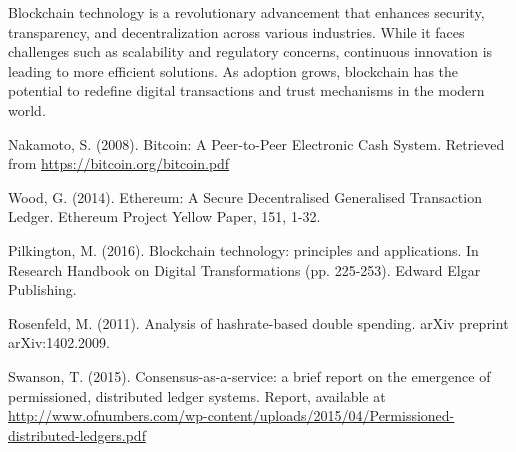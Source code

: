 \documentclass[11pt]{article}
\begin{document}
Blockchain technology is a revolutionary advancement that enhances security, transparency, and decentralization across various industries. While it faces challenges such as scalability and regulatory concerns, continuous innovation is leading to more efficient solutions. As adoption grows, blockchain has the potential to redefine digital transactions and trust mechanisms in the modern world.



\clearpage
\begin{thebibliography}{99}

Nakamoto, S. (2008). Bitcoin: A Peer-to-Peer Electronic Cash System. Retrieved from \url{https://bitcoin.org/bitcoin.pdf}

Wood, G. (2014). Ethereum: A Secure Decentralised Generalised Transaction Ledger. Ethereum Project Yellow Paper, 151, 1-32.

Pilkington, M. (2016). Blockchain technology: principles and applications. In Research Handbook on Digital Transformations (pp. 225-253). Edward Elgar Publishing.

Rosenfeld, M. (2011). Analysis of hashrate-based double spending. arXiv preprint arXiv:1402.2009.

Swanson, T. (2015). Consensus-as-a-service: a brief report on the emergence of permissioned, distributed ledger systems. Report, available at \url{http://www.ofnumbers.com/wp-content/uploads/2015/04/Permissioned-distributed-ledgers.pdf}

\end{thebibliography}
\end{document}
